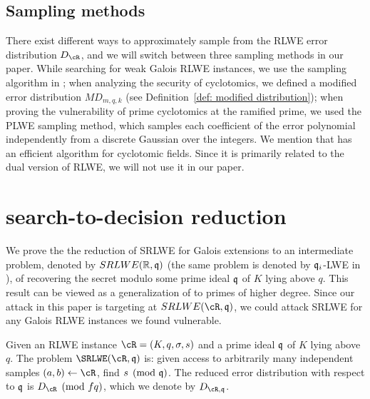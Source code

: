 \documentclass{amsart}
\begin{document}
\subsection{Sampling methods}
There exist different ways to approximately sample from the RLWE error distribution $D_\cR$, and we will switch between three sampling methods in our paper. While searching for weak Galois RLWE instances, we use the sampling algorithm in  \cite{gentry2008trapdoors}; when analyzing the security of cyclotomics, we defined a modified error distribution $MD_{m,q,k}$ (see Definition~\ref{def: modified distribution}); when proving the vulnerability of prime cyclotomics at the ramified prime, we used the PLWE sampling method, which samples each coefficient of the error polynomial independently from a discrete Gaussian over the integers. We mention that \cite{lyubashevsky2013toolkit} has an efficient algorithm for cyclotomic fields. Since it is primarily related to the dual version of RLWE, we will not use it in our paper.


\section{search-to-decision reduction}
\label{sec: s-to-d}

We prove the the reduction of SRLWE for Galois extensions to an intermediate problem, denoted by $SRLWE(\mathbb{R},\mathfrak{q})$ (the same problem is denoted by $\mathfrak{q}_i$-LWE in \cite{lyubashevsky2013ideal}), of recovering the secret modulo some prime ideal $\mathfrak{q}$ of $K $ lying above $q$. This result can be viewed as a generalization of \cite[Theorem 2]{eisentrager2014weak} to primes of higher degree. Since our attack in this paper is targeting at $SRLWE(\cR,\fq)$, we could attack SRLWE for any Galois RLWE instances we found vulnerable.


\begin{Definition} \label{def: srlwe mod q}
Given an RLWE instance $\cR = (K,q,\sigma, s)$ and a prime ideal $\mathfrak{q}$ of $K$ lying above $q$. The problem $\SRLWE(\cR, \fq)$ is: given access to arbitrarily many independent samples $(a,b) \gets \cR$, find $s \pmod {\mathfrak{q}}$. The reduced error distribution with respect to $\mathfrak{q}$ is $D_{\cR} \pmod{fq}$, which we denote by $D_{\cR,\fq}$.
\end{Definition}
\end{document}

